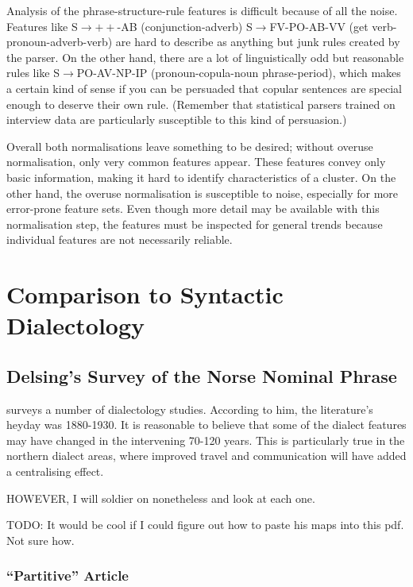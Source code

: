 Analysis of the phrase-structure-rule features is difficult because of
all the noise. Features like S$\to++$-AB (conjunction-adverb)
S$\to$FV-PO-AB-VV (get verb-pronoun-adverb-verb) are hard to describe
as anything but junk rules created by the parser. On the other hand,
there are a lot of linguistically odd but reasonable rules like
S$\to$PO-AV-NP-IP (pronoun-copula-noun phrase-period), which makes a
certain kind of sense if you can be persuaded that copular sentences
are special enough to deserve their own rule. (Remember that
statistical parsers trained on interview data are particularly
susceptible to this kind of persuasion.)

Overall both normalisations leave something to be desired; without
overuse normalisation, only very common features appear. These
features convey only basic information, making it hard to identify
characteristics of a cluster. On the other hand, the overuse
normalisation is susceptible to noise, especially for more error-prone
feature sets. Even though more detail may be available with this
normalisation step, the features must be inspected for general trends
because individual features are not necessarily reliable.

\section{Comparison to Syntactic Dialectology}

\subsection{Delsing's Survey of the Norse Nominal Phrase}

 surveys a number of dialectology
studies. According to him, the literature's heyday was 1880-1930. It
is reasonable to believe that some of the dialect features may have
changed in the intervening 70-120 years. This is particularly true in
the northern dialect areas, where improved travel and communication
will have added a centralising effect.

HOWEVER, I will soldier on nonetheless and look at each one.

TODO: It would be cool if I could figure out how to paste his maps
into this pdf. Not sure how.

\subsubsection{``Partitive'' Article}


